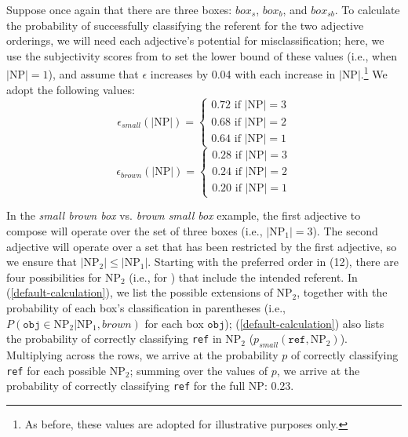 \documentclass{sp}
\newcommand{\gcs}[1]{\textcolor{blue}{[gcs: #1]}}
\begin{document}
\noindent Suppose once again that there are three boxes: $box_{s}$, $box_{b}$, and $box_{sb}$. To calculate the probability of successfully classifying the referent for the two adjective orderings, we will need each adjective's potential for misclassification; here, we use the subjectivity scores from \cite{scontrasetal2017adjectives} to set the lower bound of these values (i.e., when $|\textrm{NP}|=1$), %
and assume that $\epsilon$ increases by 0.04 with each increase in $|\textrm{NP}|$.\footnote{
As before, these values are adopted for illustrative purposes only. 
} We adopt the following values:
\setcounter{equation}{13}
\begin{equation}
\epsilon_{small}(|\textrm{NP}|) = \left\{\begin{array}{l}
0.72 \textrm{ if } |\textrm{NP}|=3\\
0.68 \textrm{ if } |\textrm{NP}|=2\\
0.64 \textrm{ if } |\textrm{NP}|=1
\end{array}
\right. 
\end{equation}
\begin{equation}
\epsilon_{brown}(|\textrm{NP}|) = \left\{\begin{array}{l}
0.28 \textrm{ if } |\textrm{NP}|=3\\
0.24 \textrm{ if } |\textrm{NP}|=2\\
0.20 \textrm{ if } |\textrm{NP}|=1
\end{array}
\right. 
\end{equation}


In the \emph{small brown box} vs. \emph{brown small box} example, the first adjective to compose will operate over the set of three boxes (i.e., $|\textrm{NP}_1| = 3$). The second adjective will operate over a set that has been restricted by the first adjective, so we ensure that $|\textrm{NP}_2| \leq |\textrm{NP}_1|$. Starting with the preferred order in (12), there are four possibilities for NP$_2$ (i.e., for ) that include the intended referent. In (\ref{default-calculation}), we list the possible extensions of NP$_2$, together with the probability of each box's classification in parentheses (i.e., $P(\texttt{obj} \in \textrm{NP}_2 | \textrm{NP}_1, brown)$ for each box $\texttt{obj}$); (\ref{default-calculation}) also lists %
the probability of correctly classifying \texttt{ref} in NP$_2$ ($p_{small}(\texttt{ref}, \textrm{NP}_2)$). Multiplying across the rows, we arrive at the probability $p$ of correctly classifying \texttt{ref} for each possible NP$_2$; summing over the values of $p$, we arrive at the probability of correctly classifying \texttt{ref} for the full NP: 0.23.
\end{document}
